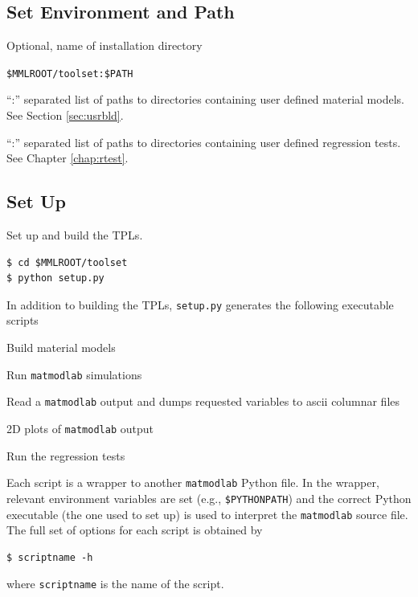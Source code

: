 \documentclass[12pt,report,strict]{SANDreport/SANDreport}
\newcommand{\mml}{\texttt{matmodlab}}
\begin{document}
\subsection{Set Environment and Path}
\label{sec:setup}

\begin{description}[leftmargin=!,labelwidth=\widthof{\texttt{MMLTESTS}}]
  \item[\texttt{MMLROOT}] Optional, name of installation directory
  \item[\texttt{PATH}] \verb|$MMLROOT/toolset:$PATH|
  \item[\texttt{MMLMTLS}] ``:'' separated list of paths to directories
  containing user defined material models. See Section \ref{sec:usrbld}.
  \item[\texttt{MMLTESTS}] ``:'' separated list of paths to directories
  containing user defined regression tests. See Chapter \ref{chap:rtest}.
\end{description}

\subsection{Set Up}
\label{sec:setup-1}
Set up and build the TPLs.
%
\begin{verbatim}
$ cd $MMLROOT/toolset
$ python setup.py
\end{verbatim}
%
In addition to building the TPLs, \texttt{setup.py} generates the following
executable scripts
%
\begin{description}[leftmargin=!,labelwidth=\widthof{\texttt{buildmtls}}]
  \item[\texttt{buildmtls}] Build material models
  \item[\texttt{mml}] Run \mml{} simulations
  \item[\texttt{exdump}] Read a \mml{} output and dumps requested variables
  to ascii columnar files
  \item[\texttt{mmv}] 2D plots of \mml{} output
  \item[\texttt{runtests}] Run the regression tests
\end{description}
%
Each script is a wrapper to another \mml{} Python file. In the wrapper,
relevant environment variables are set (e.g., \verb|$PYTHONPATH|) and the
correct Python executable (the one used to set up) is used to interpret the
\mml{} source file.  The full set of options for each script is obtained by
%
\begin{verbatim}
$ scriptname -h
\end{verbatim}
%
where \texttt{scriptname} is the name of the script.
\end{document}
